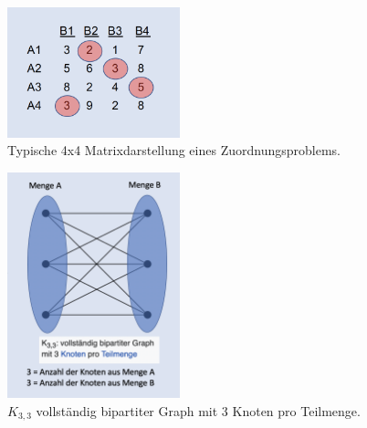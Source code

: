 \begin{figure}
\centering
\includegraphics[width=5cm]{papers/munkres/figures/Matrixdarstellung}
\caption{Typische 4x4 Matrixdarstellung eines Zuordnungsproblems.}
\label{munkres:Vr2}
\end{figure}

\begin{figure}
\centering
\includegraphics[width=5cm]{papers/munkres/figures/bipartiter_graph}
\caption{$K_{3,3}$ vollständig bipartiter Graph mit 3 Knoten pro Teilmenge.}
\label{munkres:Vr2}
\end{figure}
